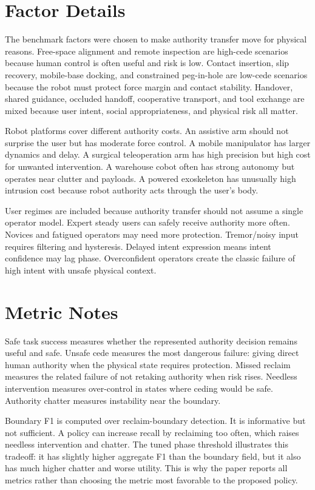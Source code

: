 \documentclass{article}
\begin{document}
\clearpage
\appendix

\section{Factor Details}

The benchmark factors were chosen to make authority transfer move for physical reasons. Free-space alignment and remote inspection are high-cede scenarios because human control is often useful and risk is low. Contact insertion, slip recovery, mobile-base docking, and constrained peg-in-hole are low-cede scenarios because the robot must protect force margin and contact stability. Handover, shared guidance, occluded handoff, cooperative transport, and tool exchange are mixed because user intent, social appropriateness, and physical risk all matter.

Robot platforms cover different authority costs. An assistive arm should not surprise the user but has moderate force control. A mobile manipulator has larger dynamics and delay. A surgical teleoperation arm has high precision but high cost for unwanted intervention. A warehouse cobot often has strong autonomy but operates near clutter and payloads. A powered exoskeleton has unusually high intrusion cost because robot authority acts through the user's body.

User regimes are included because authority transfer should not assume a single operator model. Expert steady users can safely receive authority more often. Novices and fatigued operators may need more protection. Tremor/noisy input requires filtering and hysteresis. Delayed intent expression means intent confidence may lag phase. Overconfident operators create the classic failure of high intent with unsafe physical context.

\clearpage
\section{Metric Notes}

Safe task success measures whether the represented authority decision remains useful and safe. Unsafe cede measures the most dangerous failure: giving direct human authority when the physical state requires protection. Missed reclaim measures the related failure of not retaking authority when risk rises. Needless intervention measures over-control in states where ceding would be safe. Authority chatter measures instability near the boundary.

Boundary F1 is computed over reclaim-boundary detection. It is informative but not sufficient. A policy can increase recall by reclaiming too often, which raises needless intervention and chatter. The tuned phase threshold illustrates this tradeoff: it has slightly higher aggregate F1 than the boundary field, but it also has much higher chatter and worse utility. This is why the paper reports all metrics rather than choosing the metric most favorable to the proposed policy.
\end{document}
